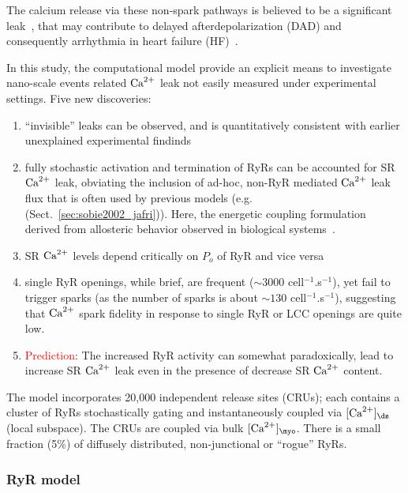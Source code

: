 The calcium release via these non-spark pathways is believed to be a significant
leak~\citep{zima2010, santiago2010}, that may contribute to delayed
afterdepolarization (DAD) and consequently arrhythmia in heart failure
(HF)~\citep{shannon2003}.

\begin{framed}
  In this study, the computational model provide an explicit means to
  investigate nano-scale events related ${\text{Ca}^{2+}}$ leak not easily measured
  under experimental settings. Five new discoveries:
  \begin{enumerate}
  \item ``invisible'' leaks can be observed, and is quantitatively
    consistent with earlier unexplained experimental findinds

  \item fully stochastic activation and termination of RyRs can be
    accounted for SR ${\text{Ca}^{2+}}$ leak, obviating the inclusion of ad-hoc,
    non-RyR mediated ${\text{Ca}^{2+}}$ leak flux that is often used by previous
    models (e.g. ~\citep{sobie2002tcas}
    (Sect.~\ref{sec:sobie2002_jafri})). Here, the energetic coupling
    formulation~\citep{groff2008} derived from allosteric behavior
    observed in biological systems~\citep{duke1999}.

  \item SR ${\text{Ca}^{2+}}$ levels depend critically on $P_o$ of RyR and vice
    versa 
  \item single RyR openings, while brief, are frequent ($\sim 3000$
    cell$^{-1}$.s$^{-1}$), yet fail to trigger sparks (as the number
    of sparks is about $\sim 130$ cell$^{-1}$.s$^{-1}$), suggesting
    that ${\text{Ca}^{2+}}$ spark fidelity in response to single RyR or LCC
    openings are quite low.
  \item \textcolor{red}{Prediction}: The increased RyR activity can
    somewhat paradoxically, lead to increase SR ${\text{Ca}^{2+}}$ leak even in the
    presence of decrease SR ${\text{Ca}^{2+}}$ content.
  \end{enumerate}
\end{framed}

The model incorporates 20,000 independent release sites (CRUs); each
contains a cluster of RyRs stochastically gating and instantaneously
coupled via $[\Ca]_\ds$ (local subspace). The CRUs are coupled via
bulk $[\Ca]_\myo$.  There is a small fraction (5\%) of diffusely
distributed, non-junctional or ``rogue'' RyRs.

\subsubsection{RyR model}
\label{sec:ryr-model-1}

